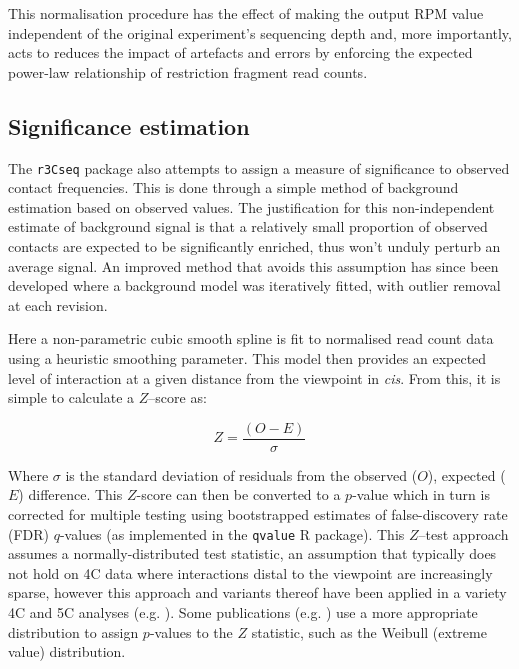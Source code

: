 \documentclass[a4paper,11pt,oneside]{book}
\begin{document}
This normalisation procedure has the effect of making the output RPM value independent of the original experiment's sequencing depth and, more importantly, acts to reduces the impact of artefacts and errors by enforcing the expected power-law relationship of restriction fragment read counts.

\subsection{Significance estimation}\label{methods:4csignif}

The \texttt{r3Cseq} package\cite{Thongjuea2013} also attempts to assign a measure of significance to observed contact frequencies. This is done through a simple method of background estimation based on observed values. The justification for this non-independent estimate of background signal is that a relatively small proportion of observed contacts are expected to be significantly enriched, thus won't unduly perturb an average signal.\cite{Thongjuea2013} An improved method that avoids this assumption has since been developed where a background model was iteratively fitted, with outlier removal at each revision.\cite{Ay2014}

Here a non-parametric cubic smooth spline is fit to normalised read count data using a heuristic smoothing parameter. This model then provides an expected level of interaction at a given distance from the viewpoint in \emph{cis}. From this, it is simple to calculate a $Z$--score as:

\begin{equation}\label{form:r3cseq}
Z = \frac{(O-E)}{\sigma}
\end{equation}

\noindent Where $\sigma$ is the standard deviation of residuals from the observed ($O$), expected ($E$) difference. This $Z$-score can then be converted to a $p$-value which in turn is corrected for multiple testing using bootstrapped estimates of false-discovery rate (FDR) $q$-values\cite{Storey2004} (as implemented in the \texttt{qvalue} R package\cite{qvalue}). This $Z$--test approach assumes a normally-distributed test statistic, an assumption that typically does not hold on 4C data where interactions distal to the viewpoint are increasingly sparse, however this approach and variants thereof have been applied in a variety 4C and 5C analyses (e.g. ). Some publications (e.g. ) use a more appropriate distribution to assign $p$-values to the $Z$ statistic, such as the Weibull (extreme value) distribution.
\end{document}
